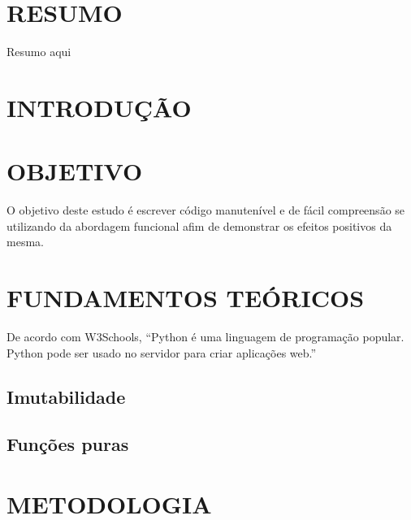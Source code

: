 \documentclass[date,twocolumn,a4paper]{ppgem}
\begin{document}
    \thispagestyle{plain}
    \makeheader




    \section*{RESUMO}
    Resumo aqui

    \section{INTRODUÇÃO}


    \section{OBJETIVO}
    O objetivo deste estudo é escrever código manutenível e de fácil compreensão se utilizando da abordagem funcional
    afim de demonstrar os efeitos positivos da mesma.

    \section{FUNDAMENTOS TEÓRICOS}
    De acordo com W3Schools\cite{w3schools_python}, ``Python é uma linguagem de programação popular. Python pode ser usado no servidor para criar aplicações web.''
    \subsection{Imutabilidade}
    \subsection{Funções puras}

    \section{METODOLOGIA}
\end{document}
